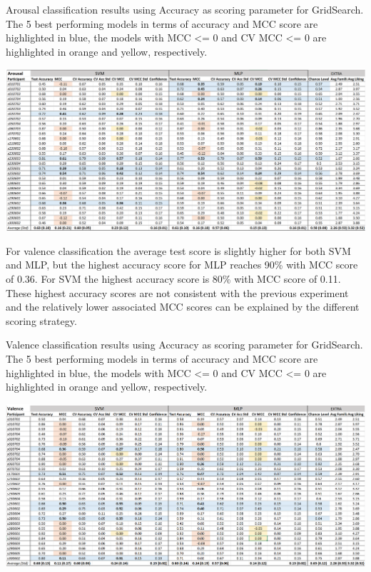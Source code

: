\begin{table}[h!]
  \caption{Arousal classification results using Accuracy as scoring parameter for GridSearch. The 5 best performing models in terms of accuracy and MCC score are highlighted in blue, the models with MCC <= 0 and CV MCC <= 0 are highlighted in orange and yellow, respectively.}
  \label{tbl:arousal_max_acc_results}
  \includegraphics[width=\linewidth]{img/results/arousal_max_acc_results.png}
\end{table}

For valence classification the average test score is slightly higher for both \ac{SVM} and \ac{MLP}, but the highest accuracy score for \ac{MLP} reaches 90\% with \ac{MCC} score of 0.36. For \ac{SVM} the highest accuracy score is 80\% with \ac{MCC} score of 0.11. These highest accuracy scores are not consistent with the previous experiment and the relatively lower associated \ac{MCC} scores can be explained by the different scoring strategy.

\begin{table}[h!]
  \caption{Valence classification results using Accuracy as scoring parameter for GridSearch. The 5 best performing models in terms of accuracy and MCC score are highlighted in blue, the models with MCC <= 0 and CV MCC <= 0 are highlighted in orange and yellow, respectively.}
  \label{tbl:valence_max_acc_results}
  \includegraphics[width=\linewidth]{img/results/valence_max_acc_results.png}
\end{table}

